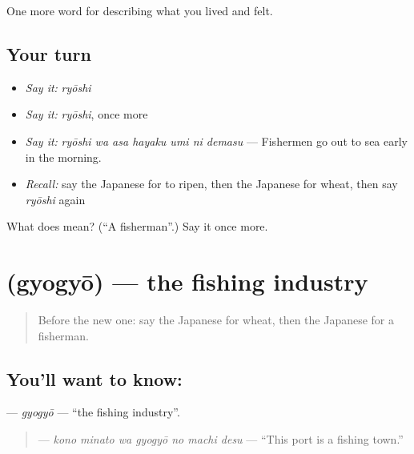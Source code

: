 \begin{grammarlens}[title={What you've built}]
One more word for describing what you lived and felt.
\end{grammarlens}

\subsection*{Your turn}
\begin{itemize}
\raggedright
  \item \emph{Say it:} \emph{ryōshi}
  \item \emph{Say it:} \emph{ryōshi}, once more
  \item \emph{Say it:} \emph{ryōshi wa asa hayaku umi ni demasu} — Fishermen go out to sea early in the morning.
  \item \emph{Recall:} say the Japanese for to ripen, then the Japanese for wheat, then say \emph{ryōshi} again
\end{itemize}

\begin{tcolorbox}[breakable,colback=teal!4,colframe=teal!35!black,title={Before you move on}]
What does  mean? (\textquotedblleft{}A fisherman\textquotedblright{}.) Say it once more.
\end{tcolorbox}
\section[\texorpdfstring{\ja{ぎょぎょう} (gyogyō)}{ぎょぎょう (gyogyō)}]{ (gyogyō) — the fishing industry}

\label{lesson:JA-C490-gyogyou}



\begin{quote}
Before the new one: say the Japanese for wheat, then the Japanese for a fisherman.
\end{quote}

\subsection*{You'll want to know: }
\textbf{} — \emph{gyogyō} — \textquotedblleft{}the fishing industry\textquotedblright{}.

\begin{quote}
\textbf{   } — \emph{kono minato wa gyogyō no machi desu} — \textquotedblleft{}This port is a fishing town.\textquotedblright{}
\end{quote}


